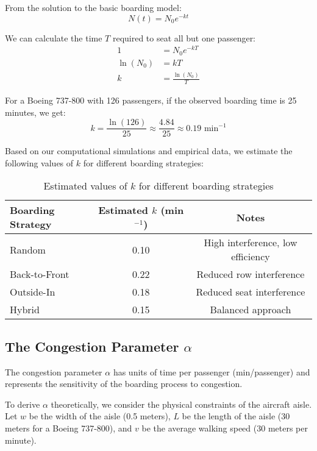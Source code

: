 \documentclass[12pt,a4paper]{article}
\begin{document}
From the solution to the basic boarding model:
\begin{equation}
N(t) = N_0 e^{-kt}
\end{equation}

We can calculate the time $T$ required to seat all but one passenger:
\begin{align}
1 &= N_0 e^{-kT} \\
\ln(N_0) &= kT \\
k &= \frac{\ln(N_0)}{T}
\end{align}

For a Boeing 737-800 with 126 passengers, if the observed boarding time is 25 minutes, we get:
\begin{equation}
k = \frac{\ln(126)}{25} \approx \frac{4.84}{25} \approx 0.19 \text{ min}^{-1}
\end{equation}

Based on our computational simulations and empirical data, we estimate the following values of $k$ for different boarding strategies:

\begin{table}[H]
\centering
\begin{tabular}{|l|c|c|}
\hline
\textbf{Boarding Strategy} & \textbf{Estimated $k$ (min$^{-1}$)} & \textbf{Notes} \\ \hline
Random & 0.10 & High interference, low efficiency \\ \hline
Back-to-Front & 0.22 & Reduced row interference \\ \hline
Outside-In & 0.18 & Reduced seat interference \\ \hline
Hybrid & 0.15 & Balanced approach \\ \hline
\end{tabular}
\caption{Estimated values of $k$ for different boarding strategies}
\label{tab:k_values}
\end{table}

\subsection{The Congestion Parameter $\alpha$}
The congestion parameter $\alpha$ has units of time per passenger (min/passenger) and represents the sensitivity of the boarding process to congestion.

To derive $\alpha$ theoretically, we consider the physical constraints of the aircraft aisle. Let $w$ be the width of the aisle (0.5 meters), $L$ be the length of the aisle (30 meters for a Boeing 737-800), and $v$ be the average walking speed (30 meters per minute).
\end{document}
